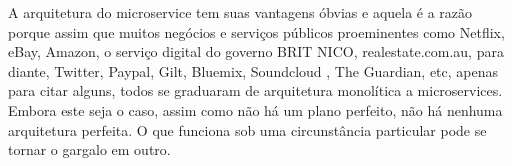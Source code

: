 A arquitetura do microservice tem suas vantagens óbvias e aquela é a razão porque assim que muitos negócios e serviços públicos proeminentes como Netflix, eBay, Amazon, o serviço digital do governo BRIT NICO, realestate.com.au, para diante, Twitter, Paypal, Gilt, Bluemix, Soundcloud , The Guardian, etc, apenas para citar alguns, todos se graduaram de arquitetura monolítica a microservices. Embora este seja o caso, assim como não há um plano perfeito, não há nenhuma arquitetura perfeita. O que funciona sob uma circunstância particular pode se tornar o gargalo em outro.





